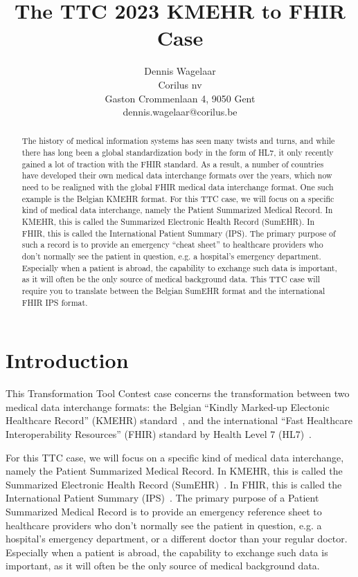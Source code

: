 \documentclass[a4paper]{scrartcl}
\title{The TTC 2023 KMEHR to FHIR Case}
\author{
  Dennis Wagelaar\\
  Corilus nv\\
  Gaston Crommenlaan 4, 9050 Gent\\
  dennis.wagelaar@corilus.be
}
\begin{document}
\maketitle

\begin{abstract}
The history of medical information systems has seen many twists and turns, and 
while there has long been a global standardization body in the form of HL7, it 
only recently gained a lot of traction with the FHIR standard. As a result, a 
number of countries have developed their own medical data interchange formats 
over the years, which now need to be realigned with the global FHIR medical 
data interchange format. One such example is the Belgian KMEHR format. 
For this TTC case, we will focus on a specific kind of medical data 
interchange, namely the Patient Summarized Medical Record. In KMEHR, this is 
called the Summarized Electronic Health Record (SumEHR). In FHIR, this is 
called the International Patient Summary (IPS). The primary purpose of such a 
record is to provide an emergency ``cheat sheet'' to healthcare providers who 
don't normally see the patient in question, e.g. a hospital's emergency 
department. Especially when a patient is abroad, the capability to exchange 
such data is important, as it will often be the only source of medical 
background data. This TTC case will require you to translate between the 
Belgian SumEHR format and the international FHIR IPS format.
\end{abstract}

\section{Introduction}

This Transformation Tool Contest case concerns the transformation between two
medical data interchange formats: the Belgian ``Kindly Marked-up Electonic
Healthcare Record'' (KMEHR) standard~\cite{kmehr_2023}, and the international
``Fast Healthcare Interoperability Resources'' (FHIR) standard by Health Level
7 (HL7)~\cite{fhir_2023}.

For this TTC case, we will focus on a specific kind of medical data 
interchange, namely the Patient Summarized Medical Record. In KMEHR, this is 
called the Summarized Electronic Health Record (SumEHR)~\cite{sumehr_2016}.
In FHIR, this is called the International Patient Summary
(IPS)~\cite{fhirips_2022}. The primary purpose of a Patient Summarized Medical
Record is to provide an emergency reference sheet to healthcare providers who 
don't normally see the patient in question, e.g. a hospital's emergency 
department, or a different doctor than your regular doctor.
Especially when a patient is abroad, the capability to exchange 
such data is important, as it will often be the only source of medical 
background data.
\end{document}
